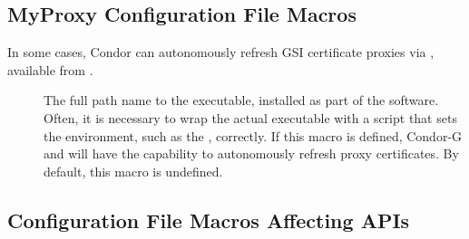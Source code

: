 \subsection{\label{sec:MyProxy-Config-File-Entries}MyProxy
Configuration File Macros}
 
In some cases, Condor can autonomously refresh GSI certificate proxies
via , available from
.

\begin{description}

\item[]
\label{param:MyProxyGetDelegation}  The full path name to the
 executable, installed as part of the
 software.  Often, it is necessary to wrap the actual
executable with a script that sets the environment, such as the
, correctly.  If this macro is defined,
Condor-G and  will have the capability to autonomously
refresh proxy certificates.  By default, this macro is undefined.

\end{description}

\subsection{\label{sec:API-Config-File-Entries}
Configuration File Macros Affecting APIs}

